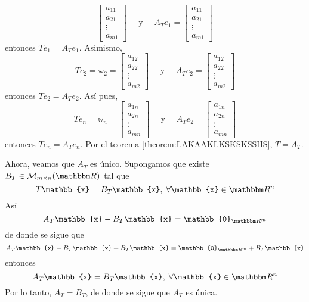 \begin{theorem}
$$\begin{bmatrix}
        a_{11} \\
        a_{21} \\
        \vdots \\
        a_{m1}
    \end{bmatrix} \quad \text{ y } \quad A_Te_1 = \begin{bmatrix}
        a_{11} \\
        a_{21} \\
        \vdots \\
        a_{m1}
    \end{bmatrix}$$
    entonces $Te_1 = A_Te_1$. Asimismo,
    $$Te_2 = \mathbb{w}_2 = \begin{bmatrix}
        a_{12} \\
        a_{22} \\
        \vdots \\
        a_{m2}
    \end{bmatrix} \quad \text{ y } \quad A_Te_2 = \begin{bmatrix}
        a_{12} \\
        a_{22} \\
        \vdots \\
        a_{m2}
    \end{bmatrix}$$
    entonces $Te_2 = A_Te_2$. Así pues,
    $$Te_n = \mathbb{w}_n = \begin{bmatrix}
        a_{1n} \\
        a_{2n} \\
        \vdots \\
        a_{mn}
    \end{bmatrix} \quad \text{ y } \quad A_Te_2 = \begin{bmatrix}
        a_{1n} \\
        a_{2n} \\
        \vdots \\
        a_{mn}
    \end{bmatrix}$$
    entonces $Te_n = A_Te_n$. Por el teorema \ref{theorem:LAKAAKLKSKSKSSIIS}, $T = A_T$.

    Ahora, veamos que $A_T$ es único. Supongamos que existe $B_T \in \matrizmn$ tal que
    $$T\mathbb{x} = B_T\mathbb{x}, \; \forall \mathbb{x} \in \RR[n]$$
    Así
    $$A_T\mathbb{x} - B_T\mathbb{x} = \mathbb{0}_{\RR[m]}$$
    de donde se sigue que
    $$A_T\mathbb{x} - B_T\mathbb{x} + B_T\mathbb{x} = \mathbb{0}_{\RR[m]} + B_T\mathbb{x}$$
    entonces
    $$A_T\mathbb{x} = B_T\mathbb{x}, \; \forall \mathbb{x} \in \RR[n]$$
    Por lo tanto, $A_T = B_T$, de donde se sigue que $A_T$ es única.
\end{theorem}

